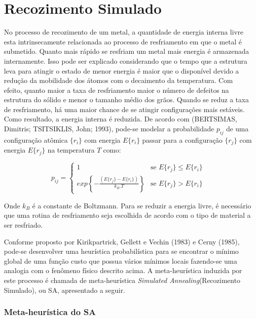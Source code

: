\section{Recozimento Simulado}

No processo de recozimento de um metal, a quantidade de energia interna livre esta intrinsecamente
relacionada ao processo de resfriamento em que o metal é submetido. Quanto mais rápido se 
resfriam um metal mais energia é armazenada internamente. Isso pode ser explicado considerando que
o tempo que a estrutura leva para atingir o estado de menor energia é maior que o disponível devido
a redução da mobilidade dos átomos com o decaimento da temperatura. Com efeito, quanto maior a taxa de
resfriamento maior o número de defeitos na estrutura do sólido e menor o tamanho médio dos grãos.
Quando se reduz a taxa de resfriamento, há uma maior chance de se atingir configurações mais estáveis.
Como resultado, a energia interna é reduzida. De acordo com (BERTSIMAS, Dimitris; TSITSIKLIS, John; 1993),
pode-se modelar a probabilidade $p_{ij}$ de uma configuração atômica $\{r_i\}$ com energia $E\{r_i\}$ 
passar para a configuração $\{r_j\}$ com energia $E\{r_j\}$ na temperatura $T$ como:

\begin{equation}
\mbox{$p_{ij}$}=\left\{
	\begin{array}{rl}
	1 & \mbox{se $E\{r_j\} \le E\{r_i\}$} \\
	exp\left\{-\frac{(E\{r_j\}-E\{r_i\})}{k_B.T}\right\} & \mbox{se $E\{r_j\} > E\{r_i\}$}
\end{array} \right.
\end{equation}

Onde $k_B$ é a constante de Boltzmann. Para se reduzir a energia livre, é necessário que uma
rotina de resfriamento seja escolhida de acordo com o tipo de material a ser resfriado.

Conforme proposto por Kirikpartrick, Gellett e Vechin (1983) e Cerny (1985), pode-se desenvolver
uma heurística probabilística para se encontrar o mínimo global de uma função custo que possua
vários mínimos locais fazendo-se uma analogia com o fenômeno físico descrito acima. A meta-heurística
induzida por este processo é chamada de meta-heurística \textit{Simulated Annealing}(Recozimento 
Simulado), ou SA, apresentado a seguir.

\subsubsection{Meta-heurística do SA}

